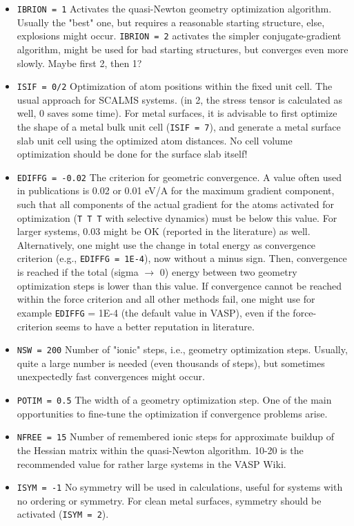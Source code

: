 \documentclass[a4paper,11pt]{article}
\begin{document}
\begin{itemize}
\item \texttt{IBRION = 1}  Activates the quasi-Newton geometry optimization algorithm. 
Usually the "best" one, but requires a reasonable starting structure, else, explosions might occur. 
\texttt{IBRION = 2} activates the simpler conjugate-gradient algorithm, might be used for bad starting structures, 
but converges even more slowly. Maybe first 2, then 1?
\item \texttt{ISIF = 0/2} Optimization of atom positions within the fixed unit cell. The usual approach 
for SCALMS systems. (in 2, the stress tensor is calculated as well, 0 saves some time).
For metal surfaces, it is advisable to first optimize the shape of a metal bulk unit cell
(\texttt{ISIF = 7}), and generate a metal surface slab unit cell using the optimized
atom distances. No cell volume optimization should be done for the surface slab itself!
\item \texttt{EDIFFG = -0.02} The criterion for geometric convergence. A value often used in publications 
is 0.02 or 0.01 eV/A for the maximum gradient component, such that all components of the actual gradient 
for the atoms activated for optimization (\texttt{T T T} with selective dynamics) must be
below this value. For larger systems, 0.03 might be OK (reported in the literature) as well. Alternatively, 
one might use the change in total energy as convergence criterion (e.g., \texttt{EDIFFG = 1E-4}), now without a 
minus sign. Then, convergence is reached if the total (sigma $\rightarrow$ 0) energy between two geometry optimization 
steps is lower than this value. If convergence cannot be reached within the force criterion and all 
other methods fail, one might use for example \texttt{EDIFFG} = 1E-4 (the default value in VASP), even if the 
force-criterion seems to have a better reputation in literature.
\item \texttt{NSW = 200} Number of "ionic" steps, i.e., geometry optimization steps. Usually, quite a 
large number is needed (even thousands of steps), but sometimes unexpectedly fast convergences might occur.
\item \texttt{POTIM = 0.5}  The width of a geometry optimization step. One of the main opportunities to 
fine-tune the optimization if convergence problems arise.
\item \texttt{NFREE = 15}  Number of remembered ionic steps for approximate buildup of the Hessian matrix
within the quasi-Newton algorithm. 10-20 is the recommended value for rather large systems in the VASP Wiki.
\item \texttt{ISYM = -1}  No symmetry will be used in calculations, useful for systems with
no ordering or symmetry. For clean metal surfaces, symmetry should be activated (\texttt{ISYM = 2}).
\end{itemize}
\end{document}
